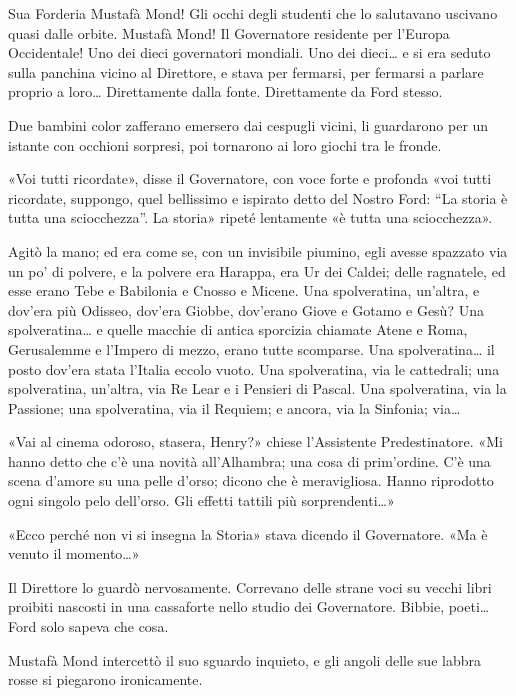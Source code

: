 \documentclass[
a5paper, %
10pt, %
twoside, 
onecolumn, %
openany, %
]{memoir}
\renewenvironment{shaded}{%
  \def\FrameCommand{\fboxsep=\FrameSep \colorbox{shadecolor}}%
  \MakeFramed{\advance\hsize-\width \FrameRestore\FrameRestore}}%
 {\endMakeFramed}
\begin{document}
Sua Forderia Mustafà Mond! Gli occhi degli studenti che lo salutavano uscivano quasi dalle orbite. Mustafà Mond! Il Governatore residente per l’Europa Occidentale! Uno dei dieci governatori mondiali. Uno dei dieci… e si era seduto sulla panchina vicino al Direttore, e stava per fermarsi, per fermarsi a parlare proprio a loro… Direttamente dalla fonte. Direttamente da Ford stesso.

Due bambini color zafferano emersero dai cespugli vicini, li guardarono per un istante con occhioni sorpresi, poi tornarono ai loro giochi tra le fronde.

«Voi tutti ricordate», disse il Governatore, con voce forte e profonda «voi tutti ricordate, suppongo, quel bellissimo e ispirato detto del Nostro Ford: “La storia è tutta una sciocchezza”. La storia» ripeté lentamente «è tutta una sciocchezza».

Agitò la mano; ed era come se, con un invisibile piumino, egli avesse spazzato via un po’ di polvere, e la polvere era Harappa, era Ur dei Caldei; delle ragnatele, ed esse erano Tebe e Babilonia e Cnosso e Micene. Una spolveratina, un’altra, e dov’era più Odisseo, dov’era Giobbe, dov’erano Giove e Gotamo e Gesù? Una spolveratina… e quelle macchie di antica sporcizia chiamate Atene e Roma, Gerusalemme e l’Impero di mezzo, erano tutte scomparse. Una spolveratina… il posto dov’era stata l’Italia eccolo vuoto. Una spolveratina, via le cattedrali; una spolveratina, un’altra, via Re Lear e i Pensieri di Pascal. Una spolveratina, via la Passione; una spolveratina, via il Requiem; e ancora, via la Sinfonia; via…

\begin{shaded}
    «Vai al cinema odoroso, stasera, Henry?» chiese l’Assistente Predestinatore. «Mi hanno detto che c’è una novità all’Alhambra; una cosa di prim’ordine. C’è una scena d’amore su una pelle d’orso; dicono che è meravigliosa. Hanno riprodotto ogni singolo pelo dell’orso. Gli effetti tattili più sorprendenti…»
\end{shaded}

«Ecco perché non vi si insegna la Storia» stava dicendo il Governatore. «Ma è venuto il momento…»

Il Direttore lo guardò nervosamente. Correvano delle strane voci su vecchi libri proibiti nascosti in una cassaforte nello studio dei Governatore. Bibbie, poeti… Ford solo sapeva che cosa.

Mustafà Mond intercettò il suo sguardo inquieto, e gli angoli delle sue labbra rosse si piegarono ironicamente.
\end{document}
